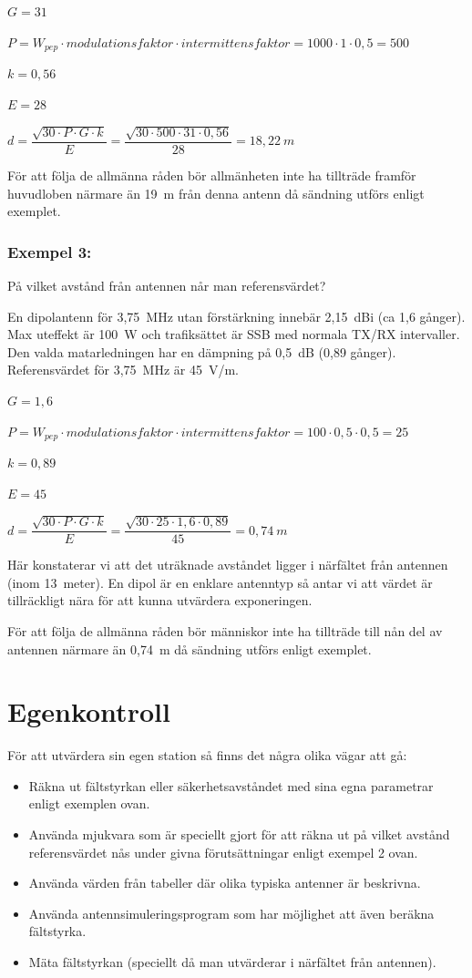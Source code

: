 \(G = 31\)

\(P = W_{pep} \cdot modulationsfaktor \cdot intermittensfaktor
= 1000 \cdot 1 \cdot 0,5 = 500\)

\(k = 0,56\)

\(E = 28\)

\(d = \dfrac{\sqrt{30 \cdot P \cdot G \cdot k}}{E}
= \dfrac{\sqrt{30 \cdot 500 \cdot 31 \cdot 0,56}}{28}
= 18,22\ m\)

För att följa de allmänna råden bör allmänheten inte ha tillträde framför
huvudloben närmare än 19~m från denna antenn då sändning utförs
enligt exemplet.

\subsubsection{Exempel 3:}

På vilket avstånd från antennen når man referensvärdet?

En dipolantenn för 3,75~MHz utan förstärkning innebär 2,15~dBi (ca 1,6 gånger).
Max uteffekt är 100~W och trafiksättet är SSB med normala TX/RX intervaller.
Den valda matarledningen har en dämpning på 0,5~dB (0,89 gånger).
Referensvärdet för 3,75~MHz är 45~V/m.

\(G = 1,6\)

\(P = W_{pep} \cdot modulationsfaktor \cdot intermittensfaktor
= 100 \cdot 0,5 \cdot 0,5 = 25\)

\(k = 0,89\)

\(E = 45\)

\(d = \dfrac{\sqrt{30 \cdot P \cdot G \cdot k}}{E} = \dfrac{\sqrt{30 \cdot 25 \cdot 1,6 \cdot 0,89}}{45}
= 0,74\ m\)

Här konstaterar vi att det uträknade avståndet ligger i närfältet från
antennen (inom 13~meter). En dipol är en enklare antenntyp så antar vi
att värdet är tillräckligt nära för att kunna utvärdera exponeringen.

För att följa de allmänna råden bör människor inte ha tillträde till
nån del av antennen närmare än 0,74~m då sändning utförs enligt exemplet.

\section{Egenkontroll}

För att utvärdera sin egen station så finns det några olika vägar att gå:

\begin{itemize}
\item Räkna ut fältstyrkan eller säkerhetsavståndet med sina egna
parametrar enligt exemplen ovan.
\item Använda mjukvara som är speciellt gjort för att räkna ut på
vilket avstånd referensvärdet nås under givna förutsättningar enligt
exempel 2 ovan.
\item Använda värden från tabeller där olika typiska antenner är beskrivna.
\item Använda antennsimuleringsprogram som har möjlighet att även
beräkna fältstyrka.
\item Mäta fältstyrkan (speciellt då man utvärderar i närfältet från antennen).
\end{itemize}

